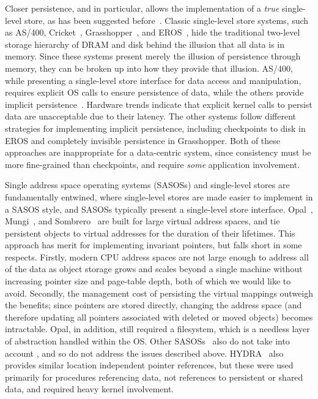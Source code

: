 Closer persistence, and \NVM in particular, allows the implementation of a \textit{true}
single-level store, as has been suggested before~\cite{bailey:hotos11}.
Classic single-level store systems, such as AS/400, Cricket~\cite{shekita:uwtr956},
Grasshopper~\cite{dearli:cs94}, and
EROS~\cite{shapiro:usenix02}, hide the traditional two-level storage hierarchy of DRAM and disk
behind the illusion that all data is in memory. Since these systems present merely the illusion of persistence
through memory, they can be broken up into how they provide that illusion. AS/400, while presenting
a single-level store interface for data access and manipulation, requires explicit OS calls to
ensure persistence of data, while the others provide implicit persistence~\cite{dearli:cs94}.
Hardware trends indicate that explicit kernel calls to persist data are unacceptable
due to their latency. The other systems follow different strategies for implementing implicit
persistence, including checkpoints to disk in EROS and completely invisible persistence in
Grasshopper. Both of these approaches are inappropriate for a data-centric system, since consistency must be more
fine-grained than checkpoints, and require \emph{some} application involvement.

Single address space operating systems (SASOSs) and single-level stores are fundamentally entwined,
where single-level stores are made easier to implement in a SASOS style, and SASOSs typically
present a single-level store interface. Opal~\cite{chase:sosp01}, Mungi~\cite{heiser:scse9314}, and
Sombrero~\cite{miller:osr00} are built for large virtual address spaces, and tie persistent objects
to virtual addresses for the duration of their lifetimes. This approach has merit for implementing
invariant pointers, but falls short in some respects. Firstly, modern
CPU address spaces are not large enough to address all of the data as object storage grows and
scales beyond a single machine without increasing pointer size and page-table depth, both of which
we would like to avoid. Secondly, the management cost of persisting the virtual mappings
outweigh the benefits; since pointers are stored directly, changing the address space (and
therefore updating all pointers associated with deleted or moved objects) becomes intractable.
Opal, in addition, still required a filesystem, which is a needless layer of abstraction handled
within the OS. Other
SASOSs~\cite{roscoe:osr94,heiser:scse9314,miller:osr00} also do not take into account \NVM, and so
do not address the issues described above.
HYDRA~\cite{wulf:cacm74} also provides similar location independent pointer references, but these
were used primarily for procedures referencing data, not references to persistent or shared data, and required
heavy kernel involvement.

